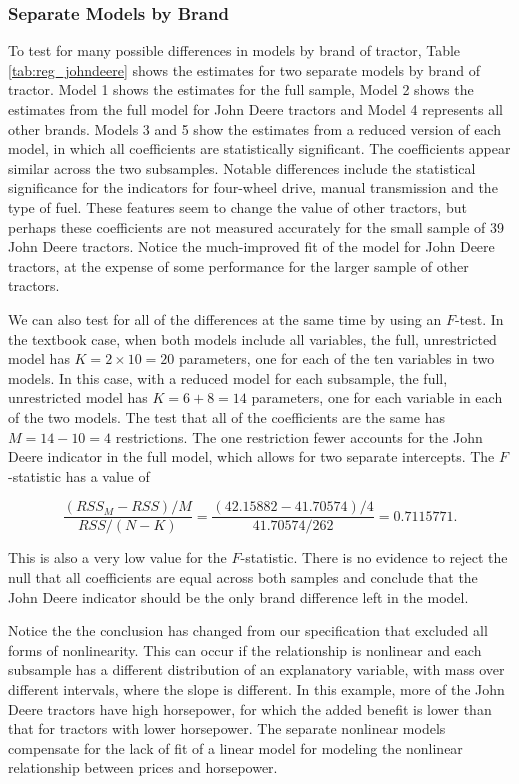 \documentclass[11pt]{paper}
\begin{document}


\clearpage
\pagebreak
\subsubsection{Separate Models by Brand}


To test for many possible differences in 
models by brand of tractor, 
Table \ref{tab:reg_johndeere}
shows the estimates for two separate models
by brand of tractor.
%
Model 1 shows the estimates for 
the full sample,
Model 2 shows the estimates from the full model for 
John Deere tractors
and Model 4 
represents all other brands. 
% 
Models 3 and 5 show the estimates from a reduced version of each model, 
in which all coefficients are statistically significant. 
% 
The coefficients appear similar across the two subsamples.
Notable differences include the statistical significance for 
the indicators for four-wheel drive, 
manual transmission and the type of fuel. 
These features seem to change the value of 
other tractors, but perhaps these coefficients are not measured 
accurately for the small sample of 39 
John Deere tractors. 
Notice the much-improved fit of the model for John Deere tractors, 
at the expense of some performance for the larger sample
of other tractors.





We can also test for all of the differences at the same time
by using an $F$-test. 
In the textbook case, when both models include all variables, 
the full, unrestricted model has $K = 2\times10 = 20$ parameters, 
one for each of the ten variables in two models. 
In this case, with a reduced model for each subsample, 
the full, unrestricted model has $K = 6 + 8 = 14$ parameters, 
one for each variable in each of the two models. 
The test that all of the coefficients are the same has $M = 14 - 10 = 4$
restrictions. 
The one restriction fewer accounts for the John Deere indicator
in the full model, 
which allows for two separate intercepts. 
% 
The $F$-statistic has a value of 

$$ 
\frac{(RSS_M - RSS)/M}{RSS/(N - K)} = \frac{(42.15882 - 41.70574)/4}{41.70574/262} = 0.7115771. 
$$

This is also a very low value for the $F$-statistic. 
There is no evidence to reject the null that all 
coefficients are equal across both samples 
and conclude that the John Deere indicator
should be the only brand difference left in the model. 

Notice the the conclusion has changed from our specification
that excluded all forms of nonlinearity.
This can occur if the relationship is nonlinear and 
each subsample has a different distribution of an explanatory variable, 
with mass over different intervals, where the slope is different. 
In this example, more of the John Deere tractors have high horsepower, 
for which the added benefit is lower than that for tractors with lower horsepower. 
The separate nonlinear models compensate for the lack of fit 
of a linear model for modeling the nonlinear 
relationship between prices and horsepower. 

\end{document}
